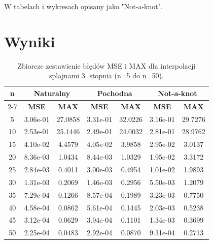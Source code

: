 \documentclass{article}
\begin{document}
W tabelach i wykresach opisany jako "Not-a-knot".
\section{Wyniki}
\begin{table}[H]
\centering
\begin{tabular}{|c|cc|cc|cc|}
\hline
\textbf{n} & \multicolumn{2}{c|}{\textbf{Naturalny}} & \multicolumn{2}{c|}{\textbf{Pochodna}} & \multicolumn{2}{c|}{\textbf{Not-a-knot}} \\ \cline{2-7}
& \textbf{MSE} & \textbf{MAX} & \textbf{MSE} & \textbf{MAX} & \textbf{MSE} & \textbf{MAX} \\ \hline
5  & 3.06e-01 & 27.0858 & 3.31e-01 & 32.0226 & 3.16e-01 & 29.7276 \\
10 & 2.53e-01 & 25.1446 & 2.49e-01 & 24.0032 & 2.81e-01 & 28.9762 \\
15 & 4.10e-02 & 4.4579  & 4.05e-02 & 3.9858  & 2.95e-02 & 3.0137  \\
20 & 8.36e-03 & 1.0434  & 8.44e-03 & 1.0329  & 1.95e-02 & 3.3172  \\
25 & 2.84e-03 & 0.4011  & 3.00e-03 & 0.4954  & 1.01e-02 & 1.9893  \\
30 & 1.31e-03 & 0.2069  & 1.46e-03 & 0.2956  & 5.50e-03 & 1.2079  \\
35 & 7.29e-04 & 0.1266  & 8.57e-04 & 0.1989  & 3.23e-03 & 0.7750  \\
40 & 4.58e-04 & 0.0862  & 5.61e-04 & 0.1445  & 2.03e-03 & 0.5238  \\
45 & 3.12e-04 & 0.0629  & 3.94e-04 & 0.1101  & 1.34e-03 & 0.3699  \\
50 & 2.25e-04 & 0.0483  & 2.92e-04 & 0.0870  & 9.31e-04 & 0.2713  \\ \hline
\end{tabular}

\caption{Zbiorcze zestawienie błędów MSE i MAX dla interpolacji splajnami 3. stopnia (n=5 do n=50).}
\label{tab:cubic_full}
\end{table}
\end{document}
